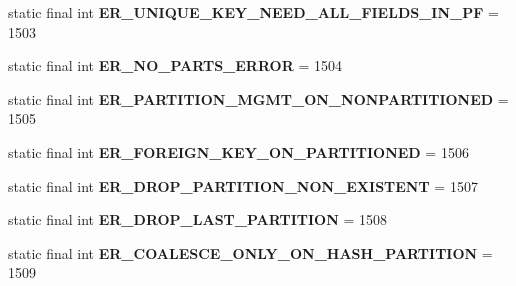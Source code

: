 \begin{DoxyCompactItemize}
static final int {\bfseries E\+R\+\_\+\+U\+N\+I\+Q\+U\+E\+\_\+\+K\+E\+Y\+\_\+\+N\+E\+E\+D\+\_\+\+A\+L\+L\+\_\+\+F\+I\+E\+L\+D\+S\+\_\+\+I\+N\+\_\+\+PF} = 1503
\item 
\mbox{\label{classcom_1_1mysql_1_1cj_1_1exceptions_1_1_mysql_error_numbers_ace365d294ef90c2f082a61c6ae85cded}} 
static final int {\bfseries E\+R\+\_\+\+N\+O\+\_\+\+P\+A\+R\+T\+S\+\_\+\+E\+R\+R\+OR} = 1504
\item 
\mbox{\label{classcom_1_1mysql_1_1cj_1_1exceptions_1_1_mysql_error_numbers_a6deb1ef506cfd2d7df31bb4ac71b8895}} 
static final int {\bfseries E\+R\+\_\+\+P\+A\+R\+T\+I\+T\+I\+O\+N\+\_\+\+M\+G\+M\+T\+\_\+\+O\+N\+\_\+\+N\+O\+N\+P\+A\+R\+T\+I\+T\+I\+O\+N\+ED} = 1505
\item 
\mbox{\label{classcom_1_1mysql_1_1cj_1_1exceptions_1_1_mysql_error_numbers_a9d35f6f3ab00f99786af30a3efa04af0}} 
static final int {\bfseries E\+R\+\_\+\+F\+O\+R\+E\+I\+G\+N\+\_\+\+K\+E\+Y\+\_\+\+O\+N\+\_\+\+P\+A\+R\+T\+I\+T\+I\+O\+N\+ED} = 1506
\item 
\mbox{\label{classcom_1_1mysql_1_1cj_1_1exceptions_1_1_mysql_error_numbers_ac1f231596b80d9744b4a4952b480a40d}} 
static final int {\bfseries E\+R\+\_\+\+D\+R\+O\+P\+\_\+\+P\+A\+R\+T\+I\+T\+I\+O\+N\+\_\+\+N\+O\+N\+\_\+\+E\+X\+I\+S\+T\+E\+NT} = 1507
\item 
\mbox{\label{classcom_1_1mysql_1_1cj_1_1exceptions_1_1_mysql_error_numbers_a5cacc9112577440196da0474ed9c2c40}} 
static final int {\bfseries E\+R\+\_\+\+D\+R\+O\+P\+\_\+\+L\+A\+S\+T\+\_\+\+P\+A\+R\+T\+I\+T\+I\+ON} = 1508
\item 
\mbox{\label{classcom_1_1mysql_1_1cj_1_1exceptions_1_1_mysql_error_numbers_af23776510e4da4e2118d46807efee8e2}} 
static final int {\bfseries E\+R\+\_\+\+C\+O\+A\+L\+E\+S\+C\+E\+\_\+\+O\+N\+L\+Y\+\_\+\+O\+N\+\_\+\+H\+A\+S\+H\+\_\+\+P\+A\+R\+T\+I\+T\+I\+ON} = 1509
\item 
\mbox{\label{classcom_1_1mysql_1_1cj_1_1exceptions_1_1_mysql_error_numbers_a68b2112c5ad7a58436e4c1dae71e3d6b}} 

\end{DoxyCompactItemize}
